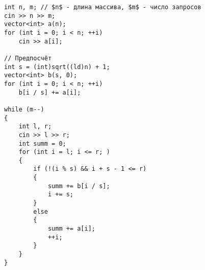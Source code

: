 \begin{verbatim}
int n, m; // $n$ - длина массива, $m$ - число запросов
cin >> n >> m;
vector<int> a(n);
for (int i = 0; i < n; ++i)
    cin >> a[i];

// Предпосчёт
int s = (int)sqrt((ld)n) + 1;
vector<int> b(s, 0);
for (int i = 0; i < n; ++i)
    b[i / s] += a[i];

while (m--)
{
    int l, r;
    cin >> l >> r;
    int summ = 0;
    for (int i = l; i <= r; )
    {
        if (!(i % s) && i + s - 1 <= r)
        {
            summ += b[i / s];
            i += s;
        }
        else
        {
            summ += a[i];
            ++i;
        }
    }
}
\end{verbatim}
